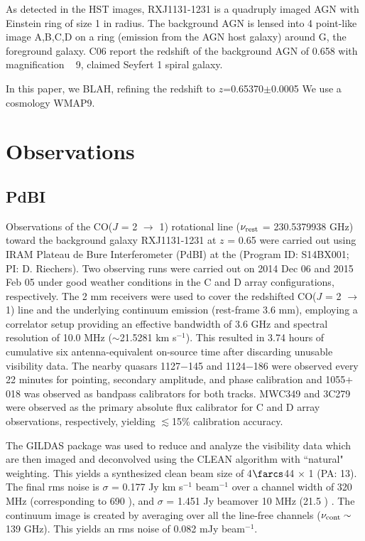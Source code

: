 As detected in the HST images, RXJ1131-1231 is a quadruply imaged AGN with
Einstein ring of size 1 in radius. The
background AGN is lensed into 4 point-like image A,B,C,D on a ring (emission
from the AGN host galaxy) around G, the foreground galaxy.
C06 report the redshift of the background AGN of 0.658 with magnification ~ 9,
claimed Seyfert 1 spiral galaxy.

In this paper, we BLAH, refining the redshift to $z$=0.65370$\pm$0.0005
We use a cosmology WMAP9.


\section{Observations}
\subsection{PdBI} \label{sec:PdBIdata}
Observations of the CO($J$ = 2 $\rightarrow$ 1) rotational line ($\nu_{\rm
rest}$ = 230.5379938 GHz) toward the background galaxy RXJ1131-1231 at $z$ =
0.65
 were carried out using IRAM Plateau de Bure Interferometer (PdBI) at the
(Program ID: S14BX001; PI: D. Riechers).
 Two observing runs were carried out on 2014 Dec 06 and 2015 Feb 05 under good
weather conditions in the C and D array configurations, respectively. The 2 mm
receivers were used to cover the redshifted CO($J$ = 2 $\rightarrow$ 1) line
and the
underlying continuum emission (rest-frame 3.6 mm), employing
a correlator setup providing an effective bandwidth of 3.6 GHz and spectral
resolution of 10.0 MHz ($\sim$21.5281 km s$^{-1}$).
This resulted in 3.74 hours of cumulative six antenna-equivalent on-source time
after discarding unusable visibility data.
The nearby quasars 1127$-$145 and 1124$-$186 were observed every 22 minutes
for
pointing, secondary amplitude, and phase calibration and 1055$+$018 was
observed as bandpass calibrators for both tracks.
MWC349 and 3C279 were observed as the primary
absolute flux calibrator for C and D array observations, respectively, yielding
$\lesssim$15\% calibration accuracy.

The GILDAS package was used to reduce and analyze the visibility data which are
then imaged and deconvolved using the CLEAN algorithm with ``natural" weighting. 
This yields a synthesized clean
beam size of 4$\farcs$44 $\times$ 1 (PA: 13\degr). The final rms noise
is $\sigma$ = 0.177 Jy km s$^{-1}$ beam$^{-1}$ over a channel width of 320 MHz (corresponding to
690 \kms), and $\sigma$ = 1.451 Jy \kms beam\pmOne over 10 MHz
(21.5 \kms) .
The continuum image is created by %
averaging over all the line-free channels ($\nu_{\rm cont}\sim$139 GHz). This
yields an rms noise of 0.082 mJy beam$^{-1}$. %

